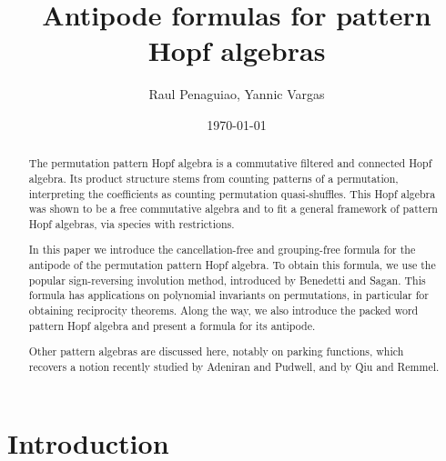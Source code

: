 \documentclass[12pt, reqno]{amsart}
\theoremstyle{definition}
\begin{document}
\title{Antipode formulas for pattern Hopf algebras} %



\author{Raul Penaguiao, Yannic Vargas}
\address{HAEUSLER AG}
\address{CUNEF University}
\date{\today} %

\begin{abstract}
The permutation pattern Hopf algebra is a commutative filtered and connected Hopf algebra.
Its product structure stems from counting patterns of a permutation, interpreting the coefficients as counting permutation quasi-shuffles.
This Hopf algebra was shown to be a free commutative algebra and to fit a general framework of pattern Hopf algebras, via species with restrictions.

In this paper we introduce the cancellation-free and grouping-free formula for the antipode of the permutation pattern Hopf algebra.
To obtain this formula, we use the popular sign-reversing involution method, introduced by Benedetti and Sagan.
This formula has applications on polynomial invariants on permutations, in particular for obtaining reciprocity theorems.
Along the way, we also introduce the packed word pattern Hopf algebra and present a formula for its antipode.

Other pattern algebras are discussed here, notably on parking functions, which recovers a notion recently studied by Adeniran and Pudwell, and by Qiu and Remmel.
\end{abstract}


\maketitle

\tableofcontents

\section{Introduction\label{sec:intro}}
\end{document}

